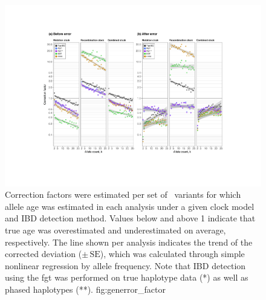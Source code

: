 

\begin{figure}[!htb]
\includegraphics[width=\textwidth]{./img/ch5/generror_factor}
{Correction factors were estimated per set of \fk{}~variants for which allele age was estimated in each analysis under a given clock model and IBD detection method.
Values below and above 1 indicate that true age was overestimated and underestimated on average, respectively.
The line shown per analysis indicates the trend of the corrected deviation ($\pm\,\text{SE}$), which was calculated through simple nonlinear regression by allele frequency.
Note that IBD detection using the \gls{fgt} was performed on true haplotype data (*) as well as phased haplotypes (**).}
{fig:generror_factor}
\end{figure}
